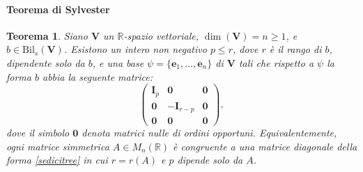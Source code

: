 \documentclass{article}
\theoremstyle{plain}
\newtheorem{thm}{Teorema}[section]
\theoremstyle{definition}
\theoremstyle{remark}
\begin{document}
\paragraph{Teorema di Sylvester}
\begin{bxthm}
\begin{thm}\label{sedicitre}
Siano $\mathbf{V}$ un $\mathbb{R}$-spazio vettoriale, $\dim(\mathbf{V}) = n \geq 1$, e 
$b\in\mathrm{Bil}_s(\mathbf{V})$. Esistono un intero non negativo 
$p \leq r$, dove $r$ è il rango di $b$, dipendente solo da $b$, e una base 
$\psi = \{\mathbf{e}_1, \ldots, \mathbf{e}_n\}$ di $\mathbf{V}$ tali che rispetto a $\psi$ la forma $b$
abbia la seguente matrice:
\begin{equation}\label{sedicitree}
\begin{pmatrix}
\mathbf{I}_p & \mathbf{0} & \mathbf{0} \\
\mathbf{0} & -\mathbf{I}_{r-p} & \mathbf{0} \\
\mathbf{0} & \mathbf{0} & \mathbf{0}
\end{pmatrix},  
\end{equation}
dove il simbolo $\mathbf{0}$ denota matrici nulle di ordini opportuni. Equivalentemente, ogni 
matrice simmetrica $A \in M_n(\mathbb{R})$ è congruente a una matrice diagonale della forma 
\ref{sedicitree} in cui $r = r(A)$ e $p$ dipende solo da $A$.
\end{thm}
\end{bxthm}
\end{document}
